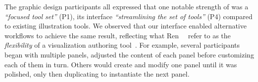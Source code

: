 



\vspace{2mm}
The graphic design participants all expressed that one notable strength of \toolname{} was a \textit{``focused tool set''} (P1), its interface \textit{``streamlining the set of tools''} (P4) compared to existing illustration tools. We observed that our interface enabled alternative workflows to achieve the same result, reflecting what Ren~\etal~ refer to as the {\it flexibility} of a visualization authoring tool~\cite{ren2018beliv}. For example, several participants began with multiple panels, adjusted the content of each panel before customizing each of them in turn. Others would create and modify one panel until it was polished, only then duplicating to instantiate the next panel.



